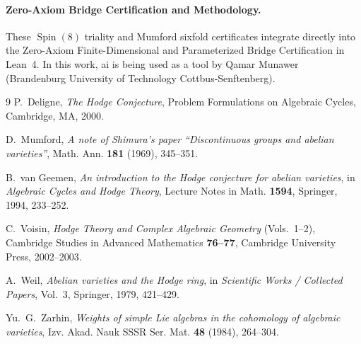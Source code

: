 \documentclass[11pt,a4paper]{article}
\begin{document}
\paragraph*{Zero-Axiom Bridge Certification and Methodology.}
These $\operatorname{Spin}(8)$ triality and Mumford sixfold certificates integrate directly into the Zero-Axiom Finite-Dimensional and Parameterized Bridge Certification in Lean~4. In this work, ai is being used as a tool by Qamar Munawer (Brandenburg University of Technology Cottbus-Senftenberg).

\begin{thebibliography}{9}
P.~Deligne, \emph{The Hodge Conjecture}, Problem Formulations on Algebraic Cycles, Cambridge, MA, 2000.

D.~Mumford, \emph{A note of Shimura's paper ``Discontinuous groups and abelian varieties''}, Math. Ann. \textbf{181} (1969), 345--351.

B.~van Geemen, \emph{An introduction to the Hodge conjecture for abelian varieties}, in \emph{Algebraic Cycles and Hodge Theory}, Lecture Notes in Math. \textbf{1594}, Springer, 1994, 233--252.

C.~Voisin, \emph{Hodge Theory and Complex Algebraic Geometry} (Vols.~1--2), Cambridge Studies in Advanced Mathematics \textbf{76--77}, Cambridge University Press, 2002--2003.

A.~Weil, \emph{Abelian varieties and the Hodge ring}, in \emph{Scientific Works / Collected Papers}, Vol.~3, Springer, 1979, 421--429.

Yu.~G.~Zarhin, \emph{Weights of simple Lie algebras in the cohomology of algebraic varieties}, Izv. Akad. Nauk SSSR Ser. Mat. \textbf{48} (1984), 264--304.
\end{thebibliography}
\end{document}
